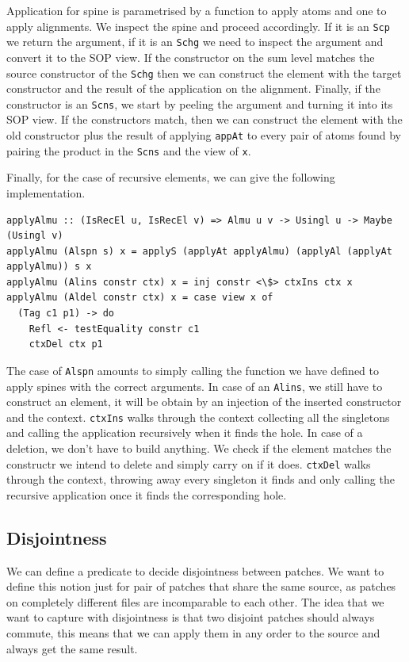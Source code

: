 \documentclass[11pt, titlepage]{article}
\newcommand{\toHaskell}[1]{\texttt{#1}\xspace}
\newcommand{\alins}{\toHaskell{Alins}}
\newcommand{\alspn}{\toHaskell{Alspn}}
\newcommand{\scp}{\toHaskell{Scp}}
\newcommand{\scns}{\toHaskell{Scns}}
\newcommand{\schg}{\toHaskell{Schg}}
\begin{document}
Application for spine is parametrised by a function to apply atoms and one to 
apply alignments. We inspect the spine and proceed accordingly. If it is an \scp 
we return the argument, if it is an \schg we need to inspect the argument and 
convert it to the SOP view. If the constructor on the sum level matches the 
source constructor of the \schg then we can construct the element with the 
target constructor and the result of the application on the alignment.
Finally, if the constructor is an \scns, we start by peeling the argument and 
turning it into its SOP view. If the constructors match, then we can construct 
the element with the old constructor plus the result of applying \texttt{appAt} 
to every pair of atoms found by pairing the product in the \scns and the view of 
\texttt{x}.

Finally, for the case of recursive elements, we can give the following 
implementation.

\begin{verbatim}
applyAlmu :: (IsRecEl u, IsRecEl v) => Almu u v -> Usingl u -> Maybe (Usingl v)
applyAlmu (Alspn s) x = applyS (applyAt applyAlmu) (applyAl (applyAt applyAlmu)) s x
applyAlmu (Alins constr ctx) x = inj constr <\$> ctxIns ctx x
applyAlmu (Aldel constr ctx) x = case view x of
  (Tag c1 p1) -> do
    Refl <- testEquality constr c1
    ctxDel ctx p1
\end{verbatim}
 
 The case of \alspn amounts to simply calling the function we have defined to 
 apply spines with the correct arguments.
In case of an \alins, we still have to construct an element, it will be obtain 
by an injection of the inserted constructor and the context. 
\texttt{ctxIns} walks through the context collecting all the singletons and 
calling the application recursively when it finds the hole.
In case of a deletion, we don't have to build anything. We check if the element 
matches the constructr we intend to delete and simply carry on if it does.
\texttt{ctxDel} walks through the context, throwing away every singleton it 
finds and only calling the recursive application once it finds the corresponding 
hole.

\subsection{Disjointness}\label{disj}
We can define a predicate to decide disjointness between patches. We want to define 
this notion just for pair of patches that share the same source, as patches on completely different files are 
incomparable to each other. 
The idea that we want to capture with disjointness is that two disjoint patches should always 
commute, this means that we can apply them in any order to the source and always get the same result.
\end{document}
